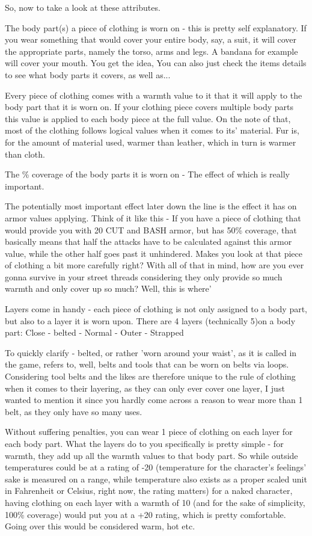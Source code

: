 So, now to take a look at these attributes.

The body part(s) a piece of clothing is worn on - this is pretty self explanatory. If you wear something that would cover your entire body, say, a suit, it will cover the appropriate parts, namely the torso, arms and legs. A bandana for example will cover your mouth. You get the idea, You can also just check the items details to see what body parts it covers, as well as...

Every piece of clothing comes with a warmth value to it that it will apply to the body part that it is worn on. If your clothing piece covers multiple body parts this value is applied to each body piece at the full value. On the note of that, most of the clothing follows logical values when it comes to its' material. Fur is, for the amount of material used, warmer than leather, which in turn is warmer than cloth.

The \% coverage of the body parts it is worn on - The effect of which is really important.

The potentially most important effect later down the line is the effect it has on armor values applying. Think of it like this - If you have a piece of clothing that would provide you with 20 CUT and BASH armor, but has 50\% coverage, that basically means that half the attacks have to be calculated against this armor value, while the other half goes past it unhindered. Makes you look at that piece of clothing a bit more carefully right? With all of that in mind, how are you ever gonna survive in your street threads considering they only provide so much warmth and only cover up so much? Well, this is where'

Layers come in handy - each piece of clothing is not only assigned to a body part, but also to a layer it is worn upon.
There are 4 layers (technically 5)on a body part: Close - belted - Normal - Outer - Strapped

To quickly clarify - belted, or rather 'worn around your waist', as it is called in the game, refers to, well, belts and tools that can be worn on belts via loops. Considering tool belts and the likes are therefore unique to the rule of clothing when it comes to their layering, as they can only ever cover one layer, I just wanted to mention it since you hardly come across a reason to wear more than 1 belt, as they only have so many uses.

Without suffering penalties, you can wear 1 piece of clothing on each layer for each body part. What the layers do to you specifically is pretty simple - for warmth, they add up all the warmth values to that body part. So while outside temperatures could be at a rating of -20 (temperature for the character's feelings' sake is measured on a range, while temperature also exists as a proper scaled unit in Fahrenheit or Celsius, right now, the rating matters) for a naked character, having clothing on each layer with a warmth of 10 (and for the sake of simplicity, 100\% coverage) would put you at a +20 rating, which is pretty comfortable. Going over this would be considered warm, hot etc.

